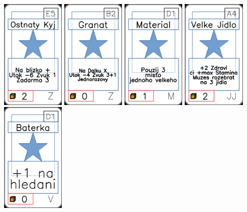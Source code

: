 \documentclass[a4paper]{article}
\begin{document}
	\includegraphics[width=3.0cm]{img-1_84}
	\includegraphics[width=3.0cm]{img-1_96}
	\includegraphics[width=3.0cm]{img-1_45}
	\includegraphics[width=3.0cm]{img-1_33}
	\includegraphics[width=3.0cm]{img-1_75}
\end{document}
